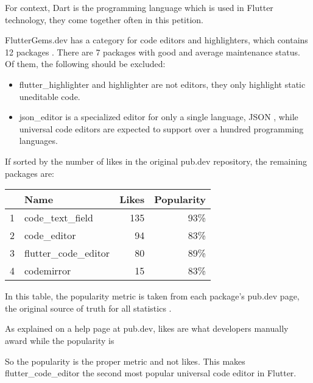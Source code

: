 For context, Dart is the programming language which is used in Flutter technology,
they come together often in this petition.

FlutterGems.dev has a category for code editors and highlighters, which contains 12 packages
.
There are 7 packages with good and average maintenance status.
Of them, the following should be excluded:

\begin{itemize}

    \item flutter\_highlighter and highlighter are not editors,
    they only highlight static uneditable code.

    \item json\_editor is a specialized editor for only a single language, JSON ,
    while universal code editors are expected to support over a hundred programming languages.

\end{itemize}

If sorted by the number of likes in the original pub.dev repository, the remaining packages are:

\begin{center}
    \begin{tabular}{|l|l|r|r|}
        \hline
        & Name & Likes & Popularity\\
        \hline
        1 & code\_text\_field & 135 & 93\%\\
        2 & code\_editor & 94 & 83\%\\
        3 & flutter\_code\_editor & 80 & 89\%\\
        4 & codemirror & 15 & 83\%\\
        \hline
    \end{tabular}
\end{center}

In this table, the popularity metric is taken from each package's pub.dev page,
the original source of truth for all statistics .

As explained on a help page at pub.dev, likes are what developers manually award
while the popularity is


So the popularity is the proper metric and not likes.
This makes flutter\_code\_editor the second most popular universal code editor in Flutter.

